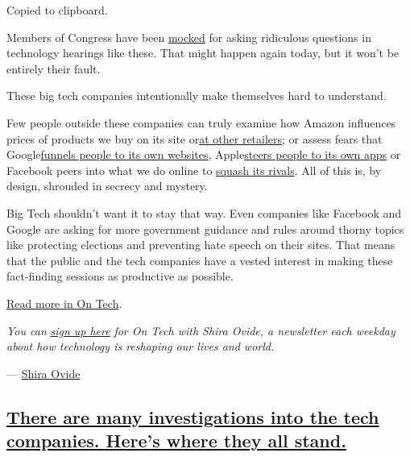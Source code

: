 Copied to clipboard.

Members of Congress have been
\href{https://www.thewrap.com/senator-orrin-hatch-facebook-biz-model-zuckerberg/}{mocked}
for asking ridiculous questions in technology hearings like these. That
might happen again today, but it won't be entirely their fault.

These big tech companies intentionally make themselves hard to
understand.

Few people outside these companies can truly examine how Amazon
influences prices of products we buy on its site
or\href{https://www.bloomberg.com/news/articles/2019-08-05/amazon-is-squeezing-sellers-that-offer-better-prices-on-walmart}{at
other retailers}; or assess fears that
Google\href{https://themarkup.org/google-the-giant/2020/07/28/google-search-results-prioritize-google-products-over-competitors}{funnels
people to its own websites},
Apple\href{https://www.nytimes3xbfgragh.onion/interactive/2019/09/09/technology/apple-app-store-competition.html}{steers
people to its own apps} or Facebook peers into what we do online to
\href{https://www.nytimes3xbfgragh.onion/2018/12/05/technology/facebook-emails-privacy-data.html}{squash
its rivals}. All of this is, by design, shrouded in secrecy and mystery.

Big Tech shouldn't want it to stay that way. Even companies like
Facebook and Google are asking for more government guidance and rules
around thorny topics like protecting elections and preventing hate
speech on their sites. That means that the public and the tech companies
have a vested interest in making these fact-finding sessions as
productive as possible.

\href{https://www.nytimes3xbfgragh.onion/2020/07/29/technology/congress-big-tech.html}{Read
more in On Tech}.

\emph{You can}
\href{https://www.nytimes3xbfgragh.onion/newsletters/signup/OT}{\emph{sign
up here}} \emph{for On Tech with Shira Ovide, a newsletter each weekday
about how technology is reshaping our lives and world.}

--- \href{https://www.nytimes3xbfgragh.onion/by/shira-ovide}{Shira
Ovide}

\hypertarget{there-are-many-investigations-into-the-tech-companies-heres-where-they-all-stand}{%
\subsection{\texorpdfstring{\protect\hyperlink{there-are-many-investigations-into-the-tech-companies-heres-where-they-all-stand}{There
are many investigations into the tech companies. Here's where they all
stand.}}{There are many investigations into the tech companies. Here's where they all stand.}}\label{there-are-many-investigations-into-the-tech-companies-heres-where-they-all-stand}}


